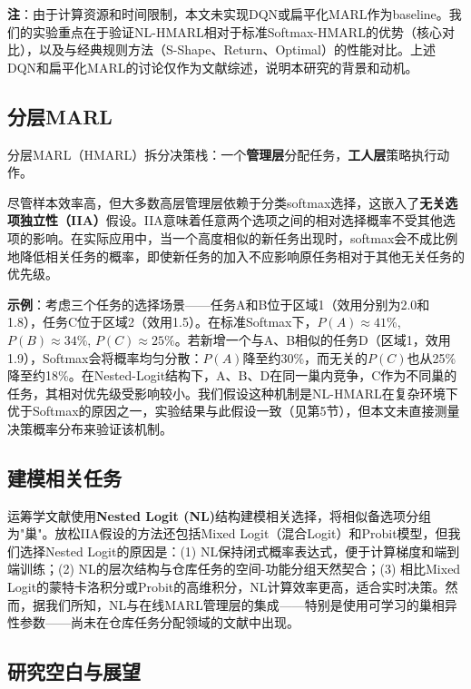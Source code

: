 \documentclass[12pt,a4paper]{article}
\begin{document}
\textbf{注}：由于计算资源和时间限制，本文未实现DQN或扁平化MARL作为baseline。我们的实验重点在于验证NL-HMARL相对于标准Softmax-HMARL的优势（核心对比），以及与经典规则方法（S-Shape、Return、Optimal）的性能对比。上述DQN和扁平化MARL的讨论仅作为文献综述，说明本研究的背景和动机。

\subsection{分层MARL}

分层MARL（HMARL）拆分决策栈：一个\textbf{管理层}分配任务，\textbf{工人层}策略执行动作\citep{krnjaic2024scalable}。

尽管样本效率高，但大多数高层管理层依赖于分类softmax选择，这嵌入了\textbf{无关选项独立性（IIA）}假设。IIA意味着任意两个选项之间的相对选择概率不受其他选项的影响。在实际应用中，当一个高度相似的新任务出现时，softmax会不成比例地降低相关任务的概率，即使新任务的加入不应影响原任务相对于其他无关任务的优先级。

\textbf{示例}：考虑三个任务的选择场景——任务A和B位于区域1（效用分别为2.0和1.8），任务C位于区域2（效用1.5）。在标准Softmax下，$P(A) \approx 41\%$, $P(B) \approx 34\%$, $P(C) \approx 25\%$。若新增一个与A、B相似的任务D（区域1，效用1.9），Softmax会将概率均匀分散：$P(A)$降至约30\%，而无关的$P(C)$也从25\%降至约18\%。在Nested-Logit结构下，A、B、D在同一巢内竞争，C作为不同巢的任务，其相对优先级受影响较小。我们假设这种机制是NL-HMARL在复杂环境下优于Softmax的原因之一，实验结果与此假设一致（见第5节），但本文未直接测量决策概率分布来验证该机制。

\subsection{建模相关任务}

运筹学文献使用\textbf{Nested Logit (NL)}结构建模相关选择，将相似备选项分组为"巢"\citep{train2009discrete}。放松IIA假设的方法还包括Mixed Logit（混合Logit）和Probit模型，但我们选择Nested Logit的原因是：(1) NL保持闭式概率表达式，便于计算梯度和端到端训练；(2) NL的层次结构与仓库任务的空间-功能分组天然契合；(3) 相比Mixed Logit的蒙特卡洛积分或Probit的高维积分，NL计算效率更高，适合实时决策。然而，据我们所知，NL与在线MARL管理层的集成——特别是使用可学习的巢相异性参数——尚未在仓库任务分配领域的文献中出现。

\subsection{研究空白与展望}
\end{document}
